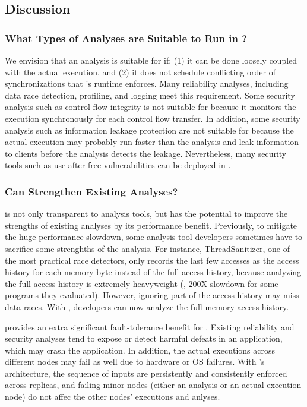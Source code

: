 
\subsection{Discussion} \label{sec:discuss}

\subsubsection{What Types of Analyses are Suitable to Run in \xxx?} 
\label{sec:analysis-types}

We envision that an analysis is suitable for \xxx if: (1) it can be done 
loosely coupled with the actual execution, and (2) it does not schedule 
conflicting order of \pthread synchronizations that \xxx's \dmt runtime 
enforces. Many reliability analyses, including data race detection, profiling, 
and logging meet this requirement. Some security analysis such as control flow 
integrity is not suitable for \xxx because it monitors the execution 
synchronously for each control flow transfer. In addition, some security 
analysis such as information leakage protection are not 
suitable for \xxx because the actual execution may probably run faster than the 
analysis and leak information to clients before the analysis detects the 
leakage. Nevertheless, many security tools such as use-after-free 
vulnerabilities can be deployed in \xxx.

\subsubsection{Can \xxx Strengthen Existing Analyses?} 
\label{sec:strengthen-analysis}

\xxx is not only transparent to analysis tools, but has the potential to 
improve the strengths of existing analyses by its performance benefit. 
Previously, to mitigate the huge performance slowdown, some analysis tool 
developers sometimes have to sacrifice some strenghths of the analysis. For 
instance, ThreadSanitizer\cite{tsan}, one of the most practical race detectors, 
only records the last few accesses as the access history for each memory byte 
instead of the full access history, because analyzing the full access history 
is extremely heavyweight (\eg, 200X slowdown for some programs they evaluated). 
However, ignoring part of the access history may miss data races. With \xxx, 
developers can now analyze the full memory access history.

\smr provides an extra significant fault-tolerance benefit for \xxx. Existing 
reliability and security analyses tend to expose or detect harmful defeats in 
an application, which may crash the application. In addition, the actual 
executions across different nodes may fail as well due to hardware or OS 
failures. With \xxx's \smr architecture, the sequence of inputs are 
persistently and consistently enforced across replicas, and failing minor 
nodes (either an analysis or an actual execution node) do not affec the other 
nodes' executions and anlyses.

